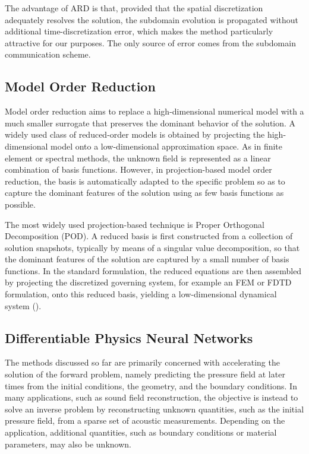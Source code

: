 \documentclass{Configuration_Files/PoliMi3i_thesis}
\begin{document}
The advantage of ARD is that, provided that the spatial discretization adequately resolves the solution, the subdomain evolution is propagated without additional time-discretization error, which makes the method particularly attractive for our purposes. The only source of error comes from the subdomain communication scheme.

\subsection{Model Order Reduction}
Model order reduction aims to replace a high-dimensional numerical model with a much smaller surrogate that preserves the dominant behavior of the solution. A widely used class of reduced-order models is obtained by projecting the high-dimensional model onto a low-dimensional approximation space. As in finite element or spectral methods, the unknown field is represented as a linear combination of basis functions. However, in projection-based model order reduction, the basis is automatically adapted to the specific problem so as to capture the dominant features of the solution using as few basis functions as possible.

The most widely used projection-based technique is Proper Orthogonal Decomposition (POD). A reduced basis is first constructed from a collection of solution snapshots, typically by means of a singular value decomposition, so that the dominant features of the solution are captured by a small number of basis functions. In the standard formulation, the reduced equations are then assembled by projecting the discretized governing system, for example an FEM or FDTD formulation, onto this reduced basis, yielding a low-dimensional dynamical system (\cite{schilders_model_2008}).
%
\subsection{Differentiable Physics Neural Networks}
The methods discussed so far are primarily concerned with accelerating the solution of the forward problem, namely predicting the pressure field at later times from the initial conditions, the geometry, and the boundary conditions. In many applications, such as sound field reconstruction, the objective is instead to solve an inverse problem by reconstructing unknown quantities, such as the initial pressure field, from a sparse set of acoustic measurements. Depending on the application, additional quantities, such as boundary conditions or material parameters, may also be unknown.
\end{document}
